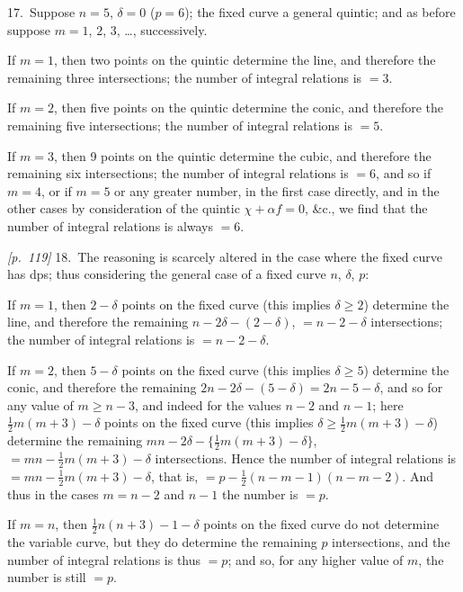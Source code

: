 \documentclass[11pt,a4paper]{article}
\theoremstyle{plain}
\theoremstyle{definition}
\theoremstyle{remark}
\begin{document}
17.\ Suppose $n = 5$, $\delta = 0$ ($p = 6$); the fixed curve a general quintic; and as before suppose $m = 1$, $2$, $3$, \ldots, successively.

If $m = 1$, then two points on the quintic determine the line, and therefore the remaining three intersections; the number of integral relations is $= 3$.

If $m = 2$, then five points on the quintic determine the conic, and therefore the remaining five intersections; the number of integral relations is $= 5$.

If $m = 3$, then 9 points on the quintic determine the cubic, and therefore the remaining six intersections; the number of integral relations is $= 6$, and so if $m = 4$, or if $m = 5$ or any greater number, in the first case directly, and in the other cases by consideration of the quintic $\chi + \alpha f = 0$, \&c., we find that the number of integral relations is always $= 6$.

\noindent\textit{[p.~119]} 18.\ The reasoning is scarcely altered in the case where the fixed curve has dps; thus considering the general case of a fixed curve $n$, $\delta$, $p$:

If $m = 1$, then $2 - \delta$ points on the fixed curve (this implies $\delta \geq 2$) determine the line, and therefore the remaining $n - 2\delta - (2 - \delta)$, $= n - 2 - \delta$ intersections; the number of integral relations is $= n - 2 - \delta$.

If $m = 2$, then $5 - \delta$ points on the fixed curve (this implies $\delta \geq 5$) determine the conic, and therefore the remaining $2n - 2\delta - (5 - \delta) = 2n - 5 - \delta$, and so for any value of $m \geq n - 3$, and indeed for the values $n - 2$ and $n - 1$; here $\tfrac{1}{2}m(m + 3) - \delta$ points on the fixed curve (this implies $\delta \geq \tfrac{1}{2}m(m + 3) - \delta$) determine the remaining $mn - 2\delta - \{\tfrac{1}{2}m(m + 3) - \delta\}$, $= mn - \tfrac{1}{2}m(m + 3) - \delta$ intersections. Hence the number of integral relations is $= mn - \tfrac{1}{2}m(m + 3) - \delta$, that is, $= p - \tfrac{1}{2}(n - m - 1)(n - m - 2)$. And thus in the cases $m = n - 2$ and $n - 1$ the number is $= p$.

If $m = n$, then $\tfrac{1}{2}n(n + 3) - 1 - \delta$ points on the fixed curve do not determine the variable curve, but they do determine the remaining $p$ intersections, and the number of integral relations is thus $= p$; and so, for any higher value of $m$, the number is still $= p$.
\end{document}
